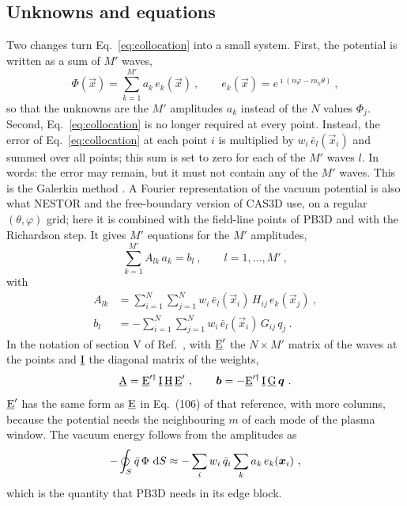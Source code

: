 \documentclass[%
 aip,
 rsi,%
 amsmath,amssymb,
 reprint,%
]{revtex4-1}
\begin{document}
\subsection{Unknowns and equations}
Two changes turn Eq.~\eqref{eq:collocation} into a small system.
First, the potential is written as a sum of $M'$ waves,
\begin{equation}
\Phi(\vec{x}) = \sum_{k=1}^{M'} a_k\,e_k(\vec{x}) \ , \qquad e_k(\vec{x}) = e^{\imath\left(n\varphi - m_k\theta\right)} \ ,
\label{eq:waves}
\end{equation}
so that the unknowns are the $M'$ amplitudes $a_k$ instead of the $N$ values $\Phi_j$.
Second, Eq.~\eqref{eq:collocation} is no longer required at every point.
Instead, the error of Eq.~\eqref{eq:collocation} at each point $i$ is multiplied by $w_i\,\bar{e}_l(\vec{x}_i)$ and summed over all points; this sum is set to zero for each of the $M'$ waves $l$.
In words: the error may remain, but it must not contain any of the $M'$ waves.
This is the Galerkin method \cite{Sauter2011BEM}.
A Fourier representation of the vacuum potential is also what NESTOR \cite{Merkel1986} and the free-boundary version of CAS3D \cite{Merkel1996} use, on a regular $(\theta,\varphi)$ grid; here it is combined with the field-line points of PB3D and with the Richardson step.
It gives $M'$ equations for the $M'$ amplitudes,
\begin{equation}
\sum_{k=1}^{M'} A_{lk}\,a_k = b_l \ , \qquad l = 1,\ldots,M' \ ,
\label{eq:galerkin}
\end{equation}
with
\begin{align}
A_{lk} &= \sum_{i=1}^{N}\sum_{j=1}^{N} w_i\,\bar{e}_l(\vec{x}_i)\,H_{ij}\,e_k(\vec{x}_j) \ , \label{eq:A}\\
b_l &= -\sum_{i=1}^{N}\sum_{j=1}^{N} w_i\,\bar{e}_l(\vec{x}_i)\,G_{ij}\,q_j \ . \label{eq:b}
\end{align}
In the notation of section V of Ref.~, with $\underline{\mathrm{E}}'$ the $N\times M'$ matrix of the waves at the points and $\underline{\mathrm{I}}$ the diagonal matrix of the weights,
\begin{equation}
\underline{\mathrm{A}} = \underline{\mathrm{E}}'^\dagger\,\underline{\mathrm{I}}\,\underline{\mathrm{H}}\,\underline{\mathrm{E}}' \ , \qquad \bm{b} = -\underline{\mathrm{E}}'^\dagger\,\underline{\mathrm{I}}\,\underline{\mathrm{G}}\,\bm{q} \ .
\end{equation}
$\underline{\mathrm{E}}'$ has the same form as $\underline{\mathrm{E}}$ in Eq.~(106) of that reference, with more columns, because the potential needs the neighbouring $m$ of each mode of the plasma window.
The vacuum energy follows from the amplitudes as
\begin{equation}
-\oint_S \bar{q}\,\Phi\,\operatorname{d}\!{S} \approx -\sum_{i} w_i\,\bar{q}_i \sum_k a_k\,e_k(\bm{x}_i) \ ,
\end{equation}
which is the quantity that PB3D needs in its edge block.
\end{document}
